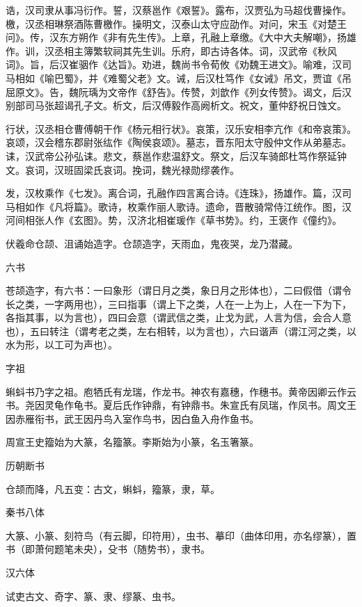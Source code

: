 \documentclass[a4paper,12pt,UTF8,twoside]{ctexbook}
\begin{document}
    诰，汉司隶从事冯衍作。誓，汉蔡邕作《艰誓》。露布，汉贾弘为马超伐曹操作。檄，汉丞相琳祭酒陈曹檄作。操明文，汉泰山太守应劭作。对问，宋玉《对楚王问》。传，汉东方朔作《非有先生传》。上章，孔融上章缴。《大中大夫解嘲》，扬雄作。训，汉丞相主簿繁软祠其先生训。乐府，即古诗各体。词，汉武帝《秋风词》。旨，后汉崔骃作《达旨》。劝进，魏尚书令荀攸《劝魏王进文》。喻难，汉司马相如《喻巴蜀》，并《难蜀父老》文。诫，后汉杜笃作《女诫》吊文，贾谊《吊屈原文》。告，魏阮瑀为文帝作《舒告》。传赞，刘歆作《列女传赞》。谒文，后汉别部司马张超谒孔子文。析文，后汉傅毅作高阙析文。祝文，董仲舒祝日蚀文。
    
    行状，汉丞相仓曹傅朝干作《杨元相行状》。哀策，汉乐安相李亢作《和帝哀策》。哀颂，汉会稽东郡尉张纮作《陶侯哀颂》。墓志，晋东阳太守殷仲文作从弟墓志。诔，汉武帝公孙弘诔。悲文，蔡邕作悲温舒文。祭文，后汉车骑郎杜笃作祭延钟文。哀词，汉班固梁氏哀词。挽词，魏光禄勋缪袭作。
    
    发，汉枚乘作《七发》。离合词，孔融作四言离合诗。《连珠》，扬雄作。篇，汉司马相如作《凡将篇》。歌诗，枚乘作丽人歌诗。遗命，晋散骑常侍江统作。图，汉河间相张人作《玄图》。势，汉济北相崔瑗作《草书势》。约，王褒作《僮约》。
    
    伏羲命仓颉、沮诵始造字。仓颉造字，天雨血，鬼夜哭，龙乃潜藏。
    
    六书
    
    苍颉造字，有六书：一曰象形（谓日月之类，象日月之形体也），二曰假借（谓令长之类，一字两用也），三曰指事（谓上下之类，人在一上为上，人在一下为下，各指其事，以为言也），四曰会意（谓武信之类，止戈为武，人言为信，会合人意也），五曰转注（谓考老之类，左右相转，以为言也），六曰谐声（谓江河之类，以水为形，以工可为声也）。
    
    字祖
    
    蝌蚪书乃字之祖。庖牺氏有龙瑞，作龙书。神农有嘉穗，作穗书。黄帝因卿云作云书。尧因灵龟作龟书。夏后氏作钟鼎，有钟鼎书。朱宣氏有凤瑞，作凤书。周文王因赤雁衔书，武王因丹鸟入室作鸟书，因白鱼入舟作鱼书。
    
    周宣王史籀始为大篆，名籀篆。李斯始为小篆，名玉箸篆。
    
    历朝断书
    
    仓颉而降，凡五变：古文，蝌蚪，籀篆，隶，草。
    
    秦书八体
    
    大篆、小篆、刻符鸟（有云脚，印符用），虫书、摹印（曲体印用，亦名缪篆），置书（即萧何题笔未央），殳书（随势书），隶书。
    
    汉六体
    
    试吏古文、奇字、篆、隶、缪篆、虫书。
    
\end{document}
